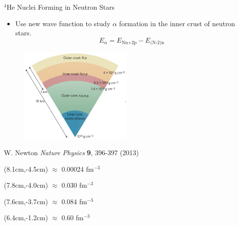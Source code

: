 \documentclass{beamer}
\begin{document}
\begin{frame}{$^4$He Nuclei Forming in Neutron Stars}
\begin{itemize}
   \item Use new wave function to study $\alpha$ formation in the inner crust of neutron stars.
   \begin{equation*}
      E_\alpha = E_\text{Nn+2p} - E_\text{(N-2)n}
   \end{equation*}
\end{itemize}
\vspace{-0.5cm}
\begin{figure}[h]
   \centering
   \includegraphics[width=0.5\textwidth]{figures/neutronstar.png}
\end{figure}
W. Newton {\it Nature Physics} {\bf 9}, 396-397 (2013)
\begin{textblock*}{\textwidth}(8.1cm,-4.5cm) %
   \tiny $\approx$ 0.00024 fm$^{-3}$
\end{textblock*}
\begin{textblock*}{\textwidth}(7.8cm,-4.0cm) %
   \tiny $\approx$ 0.030 fm$^{-3}$
\end{textblock*}
\begin{textblock*}{\textwidth}(7.6cm,-3.7cm) %
   \tiny $\approx$ 0.084 fm$^{-3}$
\end{textblock*}
\begin{textblock*}{\textwidth}(6.4cm,-1.2cm) %
   \tiny $\approx$ 0.60 fm$^{-3}$
\end{textblock*}
\end{frame}
\end{document}
